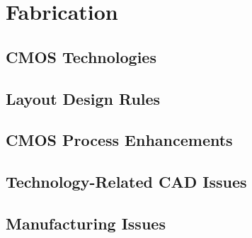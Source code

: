 \section{Fabrication}

\subsection{CMOS Technologies}

\subsection{Layout Design Rules}

\subsection{CMOS Process Enhancements}

\subsection{Technology-Related CAD Issues}

\subsection{Manufacturing Issues}
